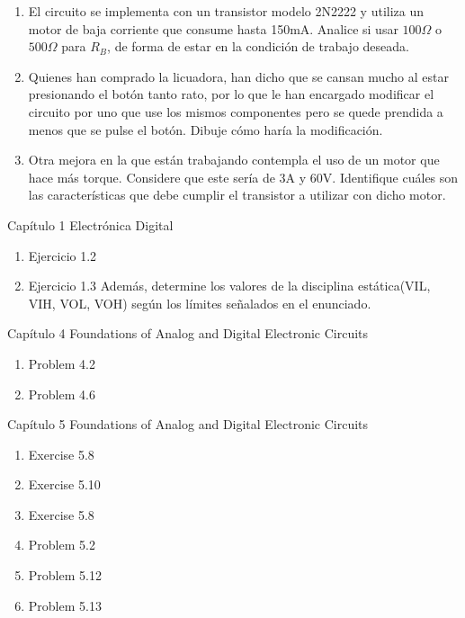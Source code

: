 \documentclass[11pt,fancy,lang=es]{elegantbook}
\begin{document}
\begin{problemset}
     \begin{enumerate}
            \item El circuito se implementa con un transistor modelo 2N2222 y utiliza un motor de baja corriente que consume hasta 150mA. Analice si usar $100\Omega$ o $500\Omega$ para $R_B$, de forma de estar en la condición de trabajo deseada. 
         \item  Quienes han comprado la licuadora, han dicho que se cansan mucho al estar presionando el botón tanto rato, por lo que le han encargado modificar el circuito por uno que use los mismos componentes pero se quede prendida a menos que se pulse el botón. Dibuje cómo haría la modificación.
         \item Otra mejora en la que están trabajando contempla el uso de un motor que hace más torque. Considere que este sería de 3A y 60V. Identifique cuáles son las características que debe cumplir el transistor a utilizar con dicho motor.  
         
     \end{enumerate}


    \item Capítulo 1 Electrónica Digital
    \begin{enumerate}
        \item Ejercicio 1.2
        \item Ejercicio 1.3 Además, determine los valores de la disciplina estática(VIL, VIH, VOL, VOH) según los límites señalados en el enunciado.
    \end{enumerate}

    \item Capítulo 4 Foundations of Analog and Digital Electronic Circuits
    \begin{enumerate}
        \item Problem 4.2
        \item Problem 4.6
    \end{enumerate}


    \item Capítulo 5 Foundations of Analog and Digital Electronic Circuits
    \begin{enumerate}
        \item Exercise 5.8
        \item Exercise 5.10
        \item Exercise 5.8
        \item Problem 5.2
        \item Problem 5.12
        \item Problem 5.13
    \end{enumerate}


\end{problemset}
\end{document}
